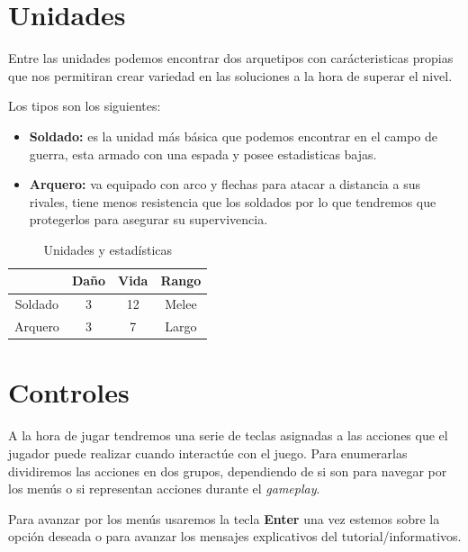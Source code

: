 \section{Unidades}
Entre las unidades podemos encontrar dos arquetipos con carácteristicas propias
que nos permitiran crear variedad en las soluciones a la hora de superar el
nivel.

Los tipos son los siguientes:
\begin{itemize}
	\item \textbf{Soldado:} es la unidad más básica que podemos encontrar en el campo de
							guerra, esta armado con una espada y posee estadisticas
							bajas.
	\item \textbf{Arquero:} va equipado con arco y flechas para atacar a distancia a
							sus rivales, tiene menos resistencia que los soldados por
							lo que tendremos que protegerlos para asegurar su
							supervivencia.
\end{itemize}

\begin{table}[ht]
\begin{center}
\begin{tabular}{|c|c|c|c|}
\hline
        & Daño & Vida & Rango \\ 
\hline
\hline
Soldado & 3    & 12    & Melee \\ 
\hline
Arquero & 3    & 7     & Largo \\ 
\hline
\end{tabular}
\caption{Unidades y estadísticas}
\end{center}
\end{table}

\section{Controles}
A la hora de jugar tendremos una serie de teclas asignadas a las acciones que el
jugador puede realizar cuando interactúe con el juego. Para enumerarlas dividiremos las
acciones en dos grupos, dependiendo de si son para navegar por los menús o si
representan acciones durante el \textit{gameplay}.

Para avanzar por los menús usaremos la tecla \textbf{Enter} una vez estemos sobre la opción deseada o
para avanzar los mensajes explicativos del tutorial/informativos.

